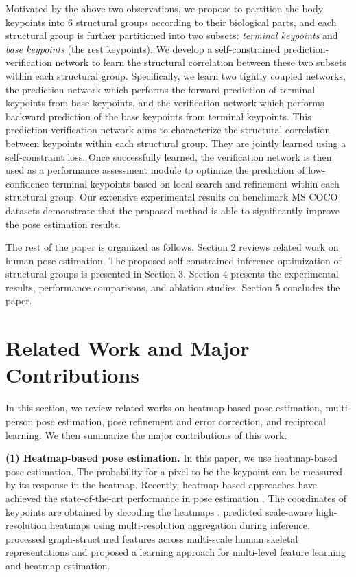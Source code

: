 \documentclass[runningheads]{llncs}
\begin{document}
Motivated by the above two observations, we propose to partition the body keypoints into 6 structural groups according to their biological parts, and each structural group is further partitioned into two subsets: \textit{terminal keypoints} and \textit{base keypoints} (the rest keypoints). We develop a self-constrained prediction-verification network to learn the structural correlation between these two subsets within each structural group. Specifically, we learn two tightly coupled networks, the prediction network  which performs the forward prediction of terminal keypoints from base keypoints, and the verification network  which performs backward prediction of the base keypoints from terminal keypoints. 
This prediction-verification network aims to characterize the structural correlation between keypoints within each structural group. They are jointly learned using a self-constraint loss.
Once successfully learned, the verification network  is then used as a performance assessment module to optimize the prediction of low-confidence terminal keypoints based on local search and refinement within each structural group.
Our extensive experimental results on benchmark MS COCO datasets demonstrate that the proposed method is able to significantly improve the pose estimation results. 

The rest of the paper is organized as follows. Section 2 reviews related work on human pose estimation. The proposed 
self-constrained inference optimization of structural groups is presented in Section 3. Section 4 presents the experimental results, performance comparisons, and ablation studies. Section 5  concludes the paper.


\section{Related Work and Major Contributions}
\label{sec:related}
In this section, we review related works on heatmap-based pose estimation, multi-person pose estimation, pose refinement and error correction, and reciprocal learning. We then summarize the major contributions of this work.

\textbf{(1) Heatmap-based pose estimation.}
In this paper, we use heatmap-based pose estimation. 
The probability for a pixel to be the keypoint can be measured by its response in the heatmap. Recently, heatmap-based approaches have achieved the state-of-the-art performance in pose estimation \cite{DBLP:conf/eccv/XiaoWW18,Cheng_2020_CVPR,DBLP:conf/cvpr/XuT21,DBLP:conf/cvpr/0009XLW19}.  The  coordinates of keypoints are obtained by decoding the heatmaps \cite{DBLP:conf/cvpr/SuYXGW19}.  \cite{Cheng_2020_CVPR} predicted scale-aware high-resolution heatmaps using multi-resolution aggregation during inference. \cite{DBLP:conf/cvpr/XuT21} processed graph-structured features across multi-scale human skeletal representations and proposed a learning approach for multi-level feature learning and heatmap estimation.
\end{document}
